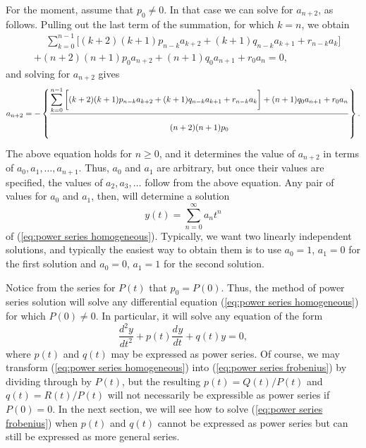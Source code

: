 \documentclass{myart}
\newcommand{\eq}[1]{(\ref{eq:#1})}
\newcommand{\deriv}[3][]{\frac{d^{#1}#2}{d#3^{#1}}}
\begin{document}
For the moment, assume that $p_0 \neq 0$. In that case we can solve
for $a_{n+2}$, as follows. Pulling out the last term of the summation,
for which $k = n$, we obtain
\begin{align*}
  &\phantom{{}+{}} \sum_{k=0}^{n-1} \bigg[
                       (k+2)(k+1) p_{n-k} a_{k+2}
                     + (k+1) q_{n-k} a_{k+1}
                     + r_{n-k} a_k
                   \bigg] \\
  &           + (n+2)(n+1) p_0 a_{n+2}
              +      (n+1) q_0 a_{n+1}
              +            r_0 a_ n
              = 0,
\end{align*}
and solving for $a_{n+2}$ gives
\begin{equation*}
  a_{n+2} = -\left\{
    \frac{\displaystyle \sum_{k=0}^{n-1} \bigg[
              (k+2)(k+1) p_{n-k} a_{k+2}
            + (k+1) q_{n-k} a_{k+1}
            + r_{n-k} a_k
          \bigg] + (n+1) q_0 a_{n+1} + r_0 a_n}
         {\displaystyle \vphantom{\sum_0^0}(n+2)(n+1)p_0}
  \right\}.
\end{equation*}
The above equation holds for $n \geq 0$, and it determines the value
of $a_{n+2}$ in terms of $a_0, a_1, \ldots, a_{n+1}$. Thus, $a_0$ and
$a_1$ are arbitrary, but once their values are specified, the values
of $a_2, a_3, \ldots$ follow from the above equation. Any pair of
values for $a_0$ and $a_1$, then, will determine a solution
\begin{equation*}
  y(t) = \sum_{n=0}^\infty a_n t^n
\end{equation*}
of \eq{power series homogeneous}. Typically, we want two linearly
independent solutions, and typically the easiest way to obtain them is
to use $a_0 = 1$, $a_1 = 0$ for the first solution and $a_0 = 0$, $a_1
= 1$ for the second solution.

Notice from the series for $P(t)$ that $p_0 = P(0)$. Thus, the method
of power series solution will solve any differential equation
\eq{power series homogeneous} for which $P(0) \neq 0$. In particular,
it will solve any equation of the form
\begin{equation} \label{eq:power series frobenius}
  \deriv[2]{y}{t} + p(t) \deriv{y}{t} + q(t) y = 0,
\end{equation}
where $p(t)$ and $q(t)$ may be expressed as power series. Of course,
we may transform \eq{power series homogeneous} into \eq{power series
  frobenius} by dividing through by $P(t)$, but the resulting $p(t) =
Q(t)/P(t)$ and $q(t) = R(t)/P(t)$ will not necessarily be expressible
as power series if $P(0) = 0$. In the next section, we will see how to
solve \eq{power series frobenius} when $p(t)$ and $q(t)$ cannot be
expressed as power series but can still be expressed as more general
series.
\end{document}
